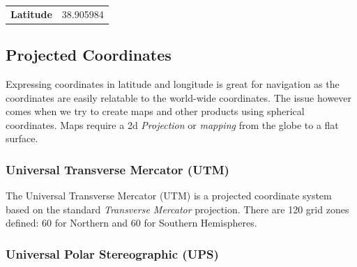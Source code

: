 \begin{table}[h!]
\begin{tabular}{l l}
\textbf{Latitude} & 38.905984
\end{tabular}
\end{table}

\subsection*{Projected Coordinates}

Expressing coordinates in latitude and longitude is great for navigation 
as the coordinates are easily relatable to the world-wide coordinates. 
The issue however comes when we try to create maps and other products using
spherical coordinates.  Maps require a 2d \emph{Projection} or \emph{mapping}
from the globe to a flat surface.  


\subsubsection*{Universal Transverse Mercator (UTM)}

The Universal Transverse Mercator (UTM) is a projected coordinate system based on the
standard \emph{Transverse Mercator} projection.  There are 120 grid zones defined:
60 for Northern and 60 for Southern Hemispheres. 




\subsubsection*{Universal Polar Stereographic (UPS)}






